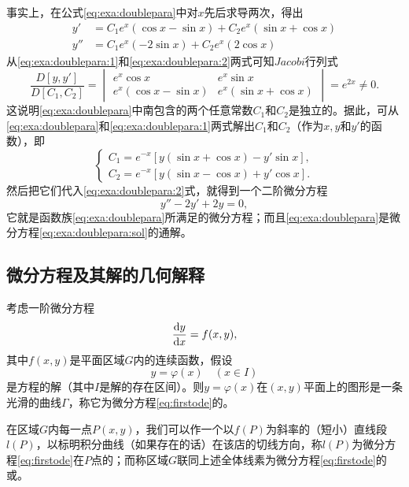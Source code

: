 事实上，在公式\eqref{eq:exa:doublepara}中对$x$先后求导两次，得出
\begin{align}
    y' &= C_1e^x(\cos x-\sin x)+C_2e^x(\sin x+\cos x)\label{eq:exa:doublepara:1} \\
    y''&= C_1e^x(-2\sin x)+C_2e^x(2\cos x)\label{eq:exa:doublepara:2}
\end{align}
从\eqref{eq:exa:doublepara:1}和\eqref{eq:exa:doublepara:2}两式可知$Jacobi$行列式
\[
    \frac{D[y,y']}{D[C_1,C_2]}
    =
    \begin{vmatrix}
    e^x\cos x & e^x\sin x \\
    e^x(\cos x-\sin x) & e^x(\sin x+\cos x)
    \end{vmatrix}
    =
    e^{2x}\neq 0.
\]
这说明\eqref{eq:exa:doublepara}中南包含的两个任意常数$C_1$和$C_2$是独立的。据此，可从\eqref{eq:exa:doublepara}和\eqref{eq:exa:doublepara:1}两式解出$C_1$和$C_2$（作为$x,y$和$y'$的函数），即
\[
    \begin{cases}
        C_1=e^{-x}[y(\sin x+\cos x)-y'\sin x], \\
        C_2=e^{-x}[y(\sin x-\cos x)+y'\cos x].
    \end{cases}
\]
然后把它们代入\eqref{eq:exa:doublepara:2}式，就得到一个二阶微分方程
\begin{equation}\label{eq:exa:doublepara:sol}
    y''-2y'+2y=0,
\end{equation}
它就是函数族\eqref{eq:exa:doublepara}所满足的微分方程；而且\eqref{eq:exa:doublepara}是微分方程\eqref{eq:exa:doublepara:sol}的通解。



\subsection{微分方程及其解的几何解释}
考虑一阶微分方程
\begin{equation}\label{eq:firstode}
    \frac{\mathrm{d} y}{\mathrm{d} x}=f(x,y),
\end{equation}
其中$f(x,y)$是平面区域$G$内的连续函数，假设
\begin{equation}\label{eq:ode:soldom}
    y=\varphi(x)\quad(x\in I)
\end{equation}
是方程的解（其中$I$是解的存在区间）。则$y=\varphi(x)$在$(x,y)$平面上的图形是一条光滑的曲线$\Gamma$，称它为微分方程\eqref{eq:firstode}的。

在区域$G$内每一点$P(x,y)$，我们可以作一个以$f(P)$为斜率的（短小）直线段$l(P)$，以标明积分曲线（如果存在的话）在该店的切线方向，称$l(P)$为微分方程\eqref{eq:firstode}在$P$点的；而称区域$G$联同上述全体线素为微分方程\eqref{eq:firstode}的或。

